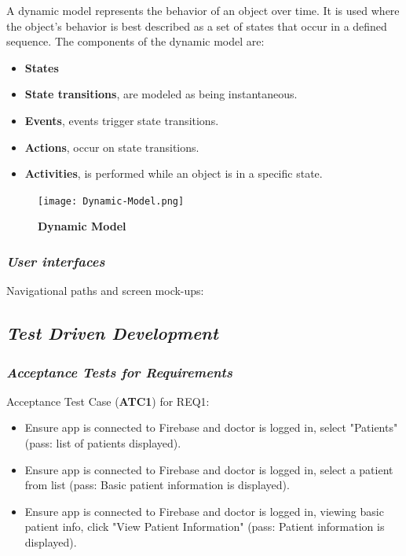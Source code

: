 \documentclass[a4paper]{article}
\begin{document}
A dynamic model represents the behavior of an object over time. It is used where the object's behavior is best described as a set of states that occur in a defined sequence. The components of the dynamic model are:

\begin{itemize}
\item \textbf{States} 
\item \textbf{State transitions}, are modeled as being instantaneous.
\item \textbf{Events}, events trigger state transitions.
\item \textbf{Actions}, occur on state transitions.
\item \textbf{Activities}, is performed while an object is in a specific state.
\end{itemize}

\FloatBarrier

\begin{figure}[h!]
\caption*{\textbf{Dynamic Model}}
\label{DncMdl}
\centering 
\texttt{[image: Dynamic-Model.png]}
\end{figure}

\FloatBarrier

\subsubsection{\textit{User interfaces}}

Navigational paths and screen mock-ups:

\subsection{\textit{Test Driven Development}}

\subsubsection{\textit{Acceptance Tests for Requirements}}

Acceptance Test Case (\textbf{ATC1}) for REQ1:

\begin{itemize}
\item Ensure app is connected to Firebase and doctor is logged in, select "Patients" (pass: list of patients displayed).
\item Ensure app is connected to Firebase and doctor is logged in, select a patient from list (pass: Basic patient information is displayed).
\item Ensure app is connected to Firebase and doctor is logged in, viewing basic patient info, click "View Patient Information" (pass: Patient information is displayed).
\end{itemize}
\end{document}
